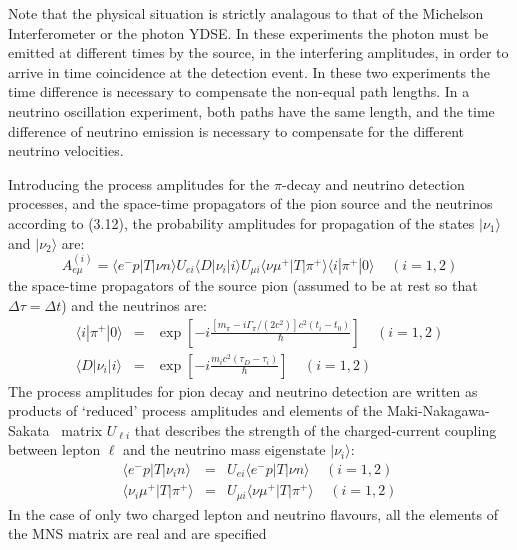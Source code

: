 \documentclass [12pt]{article}
\begin{document}
{    \par  Note that the physical situation is
    strictly analagous to that of the Michelson Interferometer or the photon YDSE.
   In these experiments the photon must be emitted at different times by the source, in
  the interfering amplitudes, in order to arrive in time coincidence at the
   detection event. In these two experiments the time difference is necessary to 
   compensate the non-equal path lengths. In a neutrino oscillation experiment,
   both paths have the same length, and the time difference of neutrino emission
   is necessary to compensate for the different neutrino velocities. 
   \par Introducing the process amplitudes for the $\pi$-decay and neutrino detection
   processes, and the space-time propagators of the pion source and the neutrinos
   according to (3.12), the probability amplitudes for propagation of the states
   $|\nu_1\rangle$ and $|\nu_2\rangle$ are: 
   \begin{equation}
    A_{e \mu}^{(i)} = \langle e^- p |T|\nu n \rangle U_{e i} \langle D |\nu_i| i \rangle U_{\mu i}
 \langle \nu \mu^+ |T|\pi^+ \rangle \langle i |\pi^+| 0 \rangle~~~~~(i = 1,2)
  \end{equation}
  the space-time propagators of the source pion (assumed to be at rest so that $\Delta \tau = \Delta t$)
   and the neutrinos are:
  \begin{eqnarray}
   \langle i |\pi^+| 0 \rangle & = & \exp \left[-i\frac{[m_{\pi}-i\Gamma_{\pi}/(2 c^2)] c^2(t_i-t_0)}
     {\hbar} \right]~~~~~(i = 1,2) \\
   \langle D |\nu_i| i \rangle & = & \exp \left[-i\frac{m_i c^2 (\tau_D-\tau_i)}  {\hbar} \right]~~~~~(i = 1,2) 
   \end{eqnarray}
 The process amplitudes for pion decay and neutrino detection are written as products of `reduced' process
  amplitudes and elements of the Maki-Nakagawa-Sakata~\cite{MNS} matrix $U_{\ell i}$ that describes the strength
 of the charged-current coupling between lepton $\ell$ and the neutrino mass eigenstate $|\nu_i\rangle$:
   \begin{eqnarray}
  \langle e^- p |T|\nu_i n \rangle & = &  U_{e i} \langle e^-  p |T|\nu n \rangle~~~~~(i = 1,2) \\
   \langle \nu_i \mu^+ |T|\pi^+ \rangle  & = & U_{\mu i} \langle \nu \mu^+ |T|\pi^+ \rangle~~~~~(i = 1,2)
   \end{eqnarray}
  In the case of only two charged lepton and neutrino flavours,
    all the elements of the MNS matrix are real and are specified
}
\end{document}
